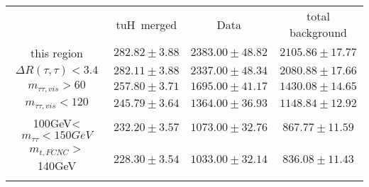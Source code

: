 \begin{tabular}{cccc} \toprule\toprule
 & tuH~merged & Data & total background\\
 this region & $282.82\pm3.88$ & $2383.00\pm48.82$ & $2105.86\pm17.77$\\
$\Delta R(\tau,\tau)<3.4$ & $282.11\pm3.88$ & $2337.00\pm48.34$ & $2080.88\pm17.66$\\
$m_{\tau\tau,vis}>60$ & $257.80\pm3.71$ & $1695.00\pm41.17$ & $1430.08\pm14.65$\\
$m_{\tau\tau,vis}<120$ & $245.79\pm3.64$ & $1364.00\pm36.93$ & $1148.84\pm12.92$\\
100GeV<$m_{\tau\tau}<150GeV$ & $232.20\pm3.57$ & $1073.00\pm32.76$ & $867.77\pm11.59$\\
$m_{t,FCNC}>$140GeV & $228.30\pm3.54$ & $1033.00\pm32.14$ & $836.08\pm11.43$\\
\bottomrule\bottomrule\\
\end{tabular}
